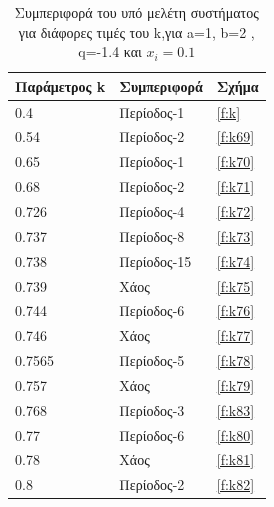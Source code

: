 \begin{table}[h!]
	\centering
	\begin{tabular}{l | l | l}
		Παράμετρος k & Συμπεριφορά & Σχήμα\\
		\hline
		0.4 &  Περίοδος-1 & \ref{f:k}\\
		0.54 &  Περίοδος-2 & \ref{f:k69}\\
		0.65& Περίοδος-1 & \ref{f:k70}\\
		0.68& Περίοδος-2 & \ref{f:k71}\\
		0.726 &  Περίοδος-4 & \ref{f:k72}\\
		0.737& Περίοδος-8 & \ref{f:k73}\\
		0.738& Περίοδος-15 & \ref{f:k74}\\
		0.739& Χάος & \ref{f:k75}\\
		0.744 &  Περίοδος-6 & \ref{f:k76}\\
		0.746 &  Χάος & \ref{f:k77}\\
		0.7565 &  Περίοδος-5 & \ref{f:k78}\\
		0.757 &  Χάος & \ref{f:k79}\\
		0.768 &  Περίοδος-3 & \ref{f:k83}\\
		0.77 &  Περίοδος-6 & \ref{f:k80}\\
		0.78 &  Χάος & \ref{f:k81}\\
		0.8 & Περίοδος-2&\ref{f:k82}\\
	\end{tabular}
	\caption{ Συμπεριφορά του υπό μελέτη συστήματος για διάφορες τιμές του k,για a=1, b=2 , q=-1.4 και
	\(x_i=0.1\)}
	\label{tab:abc6}
\end{table}

